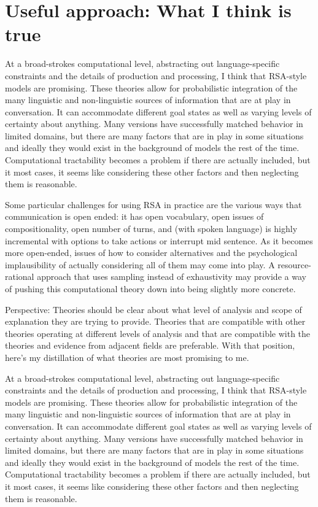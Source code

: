 \documentclass[]{article}
\begin{document}
\section{Useful approach: What I think is true}

At a broad-strokes computational level, abstracting out language-specific constraints and the details of production and processing, I think that RSA-style models are promising. These theories allow for probabilistic integration of the many linguistic and non-linguistic sources of information that are at play in conversation. It can accommodate different goal states as well as varying levels of certainty about anything. Many versions have successfully matched behavior in limited domains, but there are many factors that are in play in some situations and ideally they would exist in the background of models the rest of the time. Computational tractability becomes a problem if there are actually included, but it most cases, it seems like considering these other factors and then neglecting them is reasonable. 

Some particular challenges for using RSA in practice are the various ways that communication is open ended: it has open vocabulary, open issues of compositionality, open number of turns, and (with spoken language) is highly incremental with options to take actions or interrupt mid sentence. As it becomes more open-ended, issues of how to consider alternatives and the psychological implausibility of actually considering all of them may come into play. A resource-rational approach that uses sampling instead of exhaustivity may provide a way of pushing this computational theory down into being slightly more concrete. 

Perspective: Theories should be clear about what level of analysis and scope of explanation they are trying to provide. Theories that are compatible with other theories operating at different levels of analysis and that are compatible with the theories and evidence from adjacent fields are preferable. With that position, here's my distillation of what theories are most promising to me. 

At a broad-strokes computational level, abstracting out language-specific constraints and the details of production and processing, I think that RSA-style models are promising. These theories allow for probabilistic integration of the many linguistic and non-linguistic sources of information that are at play in conversation. It can accommodate different goal states as well as varying levels of certainty about anything. Many versions have successfully matched behavior in limited domains, but there are many factors that are in play in some situations and ideally they would exist in the background of models the rest of the time. Computational tractability becomes a problem if there are actually included, but it most cases, it seems like considering these other factors and then neglecting them is reasonable. 
\end{document}
